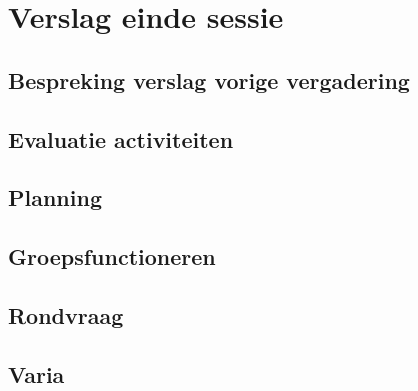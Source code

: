 \documentclass[a4paper,kulak]{kulakarticle} %
\begin{document}
\section{Verslag einde sessie}

\subsection{Bespreking verslag vorige vergadering}

\subsection{Evaluatie activiteiten}

\subsection{Planning}

\subsection{Groepsfunctioneren}

\subsection{Rondvraag}

\subsection{Varia}
\end{document}
